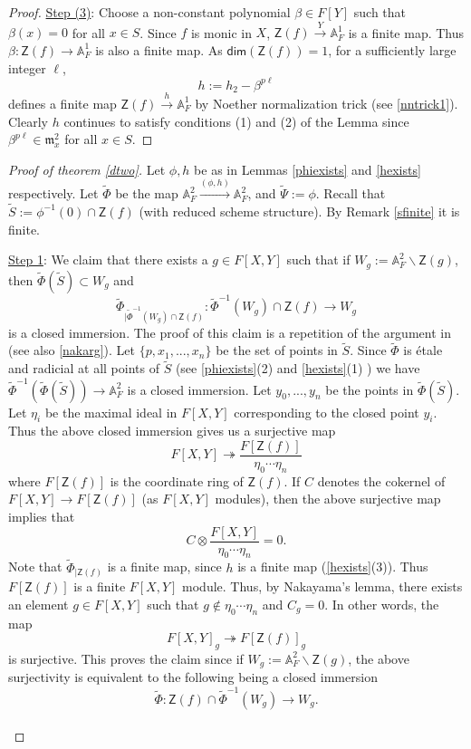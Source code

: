 \documentclass[10pt]{amsart}
\theoremstyle{plain}
\theoremstyle{definition}
\newcommand{\tensor}{\otimes}
\newcommand{\intersection}{\cap}
\renewcommand{\tilde}{\widetilde}
\newcommand{\A}{{\mathbb A}}
\let\syn\mathsf
\begin{document}
\begin{proof}
\noindent \underline{Step (3)}: Choose a non-constant polynomial $\beta \in F[Y]$ such that 
$\beta(x)=0$ for all $x\in S$. Since $f$ is monic in $X$,  $\syn{Z}(f)\xrightarrow{Y} \A^1_F$ is a finite map. Thus $\beta :\syn{Z}(f) \to \A^1_F$ is also a finite map. As $\syn{dim}(\syn{Z}(f))=1$, for a sufficiently large integer $\ell$, $$h:=h_2-\beta^{p\ell}$$
defines a finite map $\syn{Z}(f) \xrightarrow{h} \A^1_F$ by Noether normalization trick (see \eqref{nntrick1}).   Clearly $h$ continues to satisfy conditions (1) and (2) of the Lemma since $\beta^{p\ell} \in {\mathfrak m}_x^2$ for all $x\in S$. 

\end{proof}


\begin{proof}[Proof of theorem \ref{dtwo}]
 Let $\phi,h$ be as in Lemmas \ref{phiexists} and \ref{hexists} respectively. Let  $\widetilde{\Phi}$ be the map $\A^2_F \xrightarrow{(\phi,h)} \A^{2}_F$, and $\widetilde{\Psi}:=\phi$. Recall that $\tilde{S}:= \phi^{-1}(0)\intersection \syn{Z}(f)$ (with reduced scheme structure). By Remark \ref{sfinite} it is finite. 

\noindent \underline{Step 1}:  We claim that there exists a $g\in F[X,Y]$ such that if $W_g:=\A^2_F\backslash \syn{Z}(g)$, then  $\widetilde{\Phi}(\tilde{S})\subset W_g$ and  
$$ \widetilde{\Phi}_{|\widetilde{\Phi}^{-1}(W_g)\intersection \syn{Z}(f)} : \widetilde{\Phi}^{-1}(W_g)\intersection \syn{Z}(f) \longrightarrow W_g$$ 
is a closed immersion. The proof of this claim is a repetition of the argument in \cite[3.5.1]{chk} (see also \eqref{nakarg}). Let $\{p, x_1,...,x_n\}$ be the set of points in $\tilde{S}$. Since $\widetilde{\Phi}$ is \'{e}tale and radicial at all points of $\tilde{S}$ (see \eqref{phiexists}(2) and \eqref{hexists}(1) ) we have 
$ \widetilde{\Phi}^{-1}(\widetilde{\Phi}(\tilde{S})) \to \A^2_F$ is a closed immersion.  Let $y_0,...,y_n$ be the points in $\widetilde{\Phi}(\tilde{S})$. Let $\eta_i$ be the maximal ideal in $F[X,Y]$ corresponding to the closed point $y_i$. Thus the above closed immersion gives us a surjective map 
$$ F[X,Y] \twoheadrightarrow  \frac{ F[\syn{Z}(f)]}{ \eta_0\cdots \eta_n}$$
where $F[\syn{Z}(f)]$ is the coordinate ring of $\syn{Z}(f)$. 
If $C$ denotes the cokernel of $F[X,Y] \to F[\syn{Z}(f)]$ (as $F[X,Y]$ modules), then the above surjective map implies that $$C \tensor \frac{F[X,Y]}{\eta_0\cdots \eta_n} = 0 .$$
Note that $\widetilde{\Phi}_{| \syn{Z}(f)}$ is a finite map, since $h$ is a finite map (\eqref{hexists}(3)). Thus $F[\syn{Z}(f)]$ is a finite $F[X,Y]$ module.  Thus, by Nakayama's lemma, there exists an element $g \in F[X,Y]$ such that 
$g \notin \eta_0\cdots \eta_n $ and $C_g=0$. In other words, the map 
$$ F[X,Y]_g \twoheadrightarrow  F[\syn{Z}(f)]_g$$ 
is surjective. This proves the claim since if $W_g:= \A^2_F \backslash \syn{Z}(g)$, the above surjectivity is equivalent to the following being a closed immersion 
$$ \widetilde{\Phi} : \syn{Z}(f) \intersection \widetilde{\Phi}^{-1}(W_g)  \to W_g.$$ \\


\end{proof}
\end{document}

